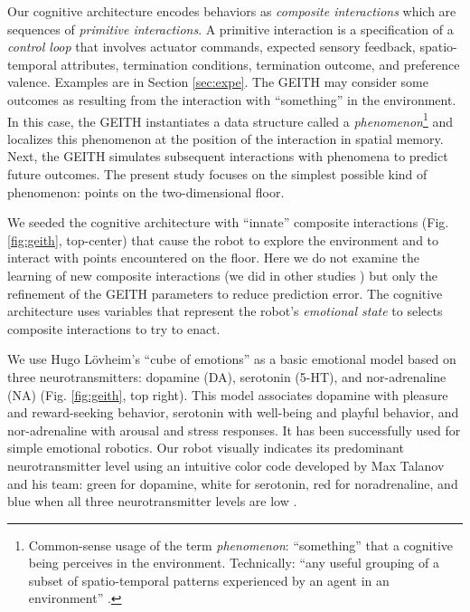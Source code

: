 \documentclass[runningheads]{llncs}
\begin{document}
Our cognitive architecture encodes behaviors as \textit{composite interactions} which are sequences of \textit{primitive interactions}.
A primitive interaction is a specification of a \textit{control loop} that involves actuator commands, expected sensory feedback, spatio-temporal attributes, termination conditions, termination outcome, and preference valence. 
Examples are in Section \ref{sec:expe}. 
The GEITH may consider some outcomes as resulting from the interaction with ``something'' in the environment.
In this case, the GEITH instantiates a data structure called a \textit{phenomenon}\footnote{Common-sense usage of the term \textit{phenomenon}: ``something'' that a cognitive being perceives in the environment. Technically: ``any useful grouping of a subset of spatio-temporal patterns experienced by an agent in an environment'' \cite[p. 8]{thorisson_explanation_2021}.} and localizes this phenomenon at the position of the interaction in spatial memory.
Next, the GEITH simulates subsequent interactions with phenomena to predict future outcomes. 
The present study focuses on the simplest possible kind of phenomenon: points on the two-dimensional floor.

We seeded the cognitive architecture with ``innate'' composite interactions (Fig. \ref{fig:geith}, top-center) that cause the robot to explore the environment and to interact with points encountered on the floor. 
Here we do not examine the learning of new composite interactions (we did in other studies \cite{georgeon_cash_2019}) but only the refinement of the GEITH parameters to reduce prediction error.
The cognitive architecture uses variables that represent the robot's \textit{emotional state} to selects composite interactions to try to enact.

We use Hugo Lövheim's ``cube of emotions'' \cite{lovheim_new_2012} as a basic emotional model based on three neurotransmitters: dopamine (DA), serotonin (5-HT), and nor-adrenaline (NA) (Fig. \ref{fig:geith}, top right).
This model associates dopamine with pleasure and reward-seeking behavior, serotonin with well-being and playful behavior, and nor-adrenaline with arousal and stress responses.
It has been successfully used for simple emotional robotics.
Our robot visually indicates its predominant neurotransmitter level using an intuitive color code developed by Max Talanov and his team: green for dopamine, white for serotonin, red for noradrenaline, and blue when all three neurotransmitter levels are low \cite{chebotareva_emotional_2019}.
\end{document}
